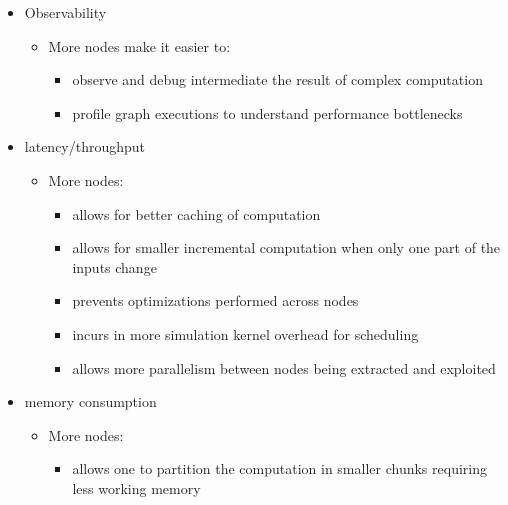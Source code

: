 \documentclass[11pt, reqno]{amsart}
\theoremstyle{definition}
\theoremstyle{remark}
\begin{document}
\begin{itemize}
  \item Observability

        \begin{itemize}
          \item More nodes make it easier to:

                \begin{itemize}
                  \item observe and debug intermediate the result of complex computation
                  \item profile graph executions to understand performance bottlenecks
                \end{itemize}
        \end{itemize}
  \item latency/throughput

        \begin{itemize}
          \item More nodes:

                \begin{itemize}
                  \item allows for better caching of computation
                  \item allows for smaller incremental computation when only one part of
                        the inputs change
                  \item prevents optimizations performed across nodes
                  \item incurs in more simulation kernel overhead for scheduling
                  \item allows more parallelism between nodes being extracted
                        and exploited
                \end{itemize}
        \end{itemize}
  \item memory consumption

        \begin{itemize}
          \item More nodes:

                \begin{itemize}
                  \item allows one to partition the computation in smaller
                        chunks requiring less working memory
                \end{itemize}
        \end{itemize}
\end{itemize}
\end{document}
